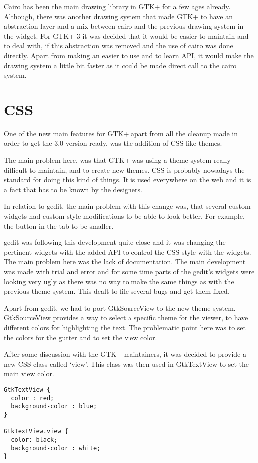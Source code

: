 Cairo has been the main drawing library in GTK+ for a few ages already. Although, there was another drawing system that made GTK+ to have an abstraction layer and a mix between cairo and the previous drawing system in the widget. For GTK+ 3 it was decided that it would be easier to maintain and to deal with, if this abstraction was removed and the use of cairo was done directly. Apart from making an easier to use and to learn API, it would make the drawing system a little bit faster as it could be made direct call to the cairo system.

\section{CSS}

One of the new main features for GTK+ apart from all the cleanup made in order to get the 3.0 version ready, was the addition of CSS like themes.

The main problem here, was that GTK+ was using a theme system really difficult to maintain, and to create new themes. CSS is probably nowadays the standard for doing this kind of things. It is used everywhere on the web and it is a fact that has to be known by the designers.

In relation to gedit, the main problem with this change was, that several custom widgets had custom style modifications to be able to look better. For example, the button in the tab to be smaller.

gedit was following this development quite close and it was changing the pertinent widgets with the added API to control the CSS style with the widgets. The main problem here was the lack of documentation. The main development was made with trial and error and for some time parts of the gedit's widgets were looking very ugly as there was no way to make the same things as with the previous theme system. This dealt to file several bugs and get them fixed.

Apart from gedit, we had to port GtkSourceView to the new theme system. GtkSourceView provides a way to select a specific theme for the viewer, to have different colors for highlighting the text. The problematic point here was to set the colors for the gutter and to set the view color.

After some discussion with the GTK+ maintainers, it was decided to provide a new CSS class called `view'. This class was then used in GtkTextView to set the main view color.

\begin{lstlisting}[style=plain]
GtkTextView {
  color : red;
  background-color : blue;
}

GtkTextView.view {
  color: black;
  background-color : white;
}
\end{lstlisting}

